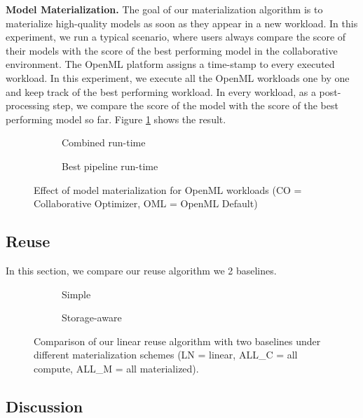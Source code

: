 \textbf{Model Materialization. }
The goal of our materialization algorithm is to materialize high-quality models as soon as they appear in a new workload.
In this experiment, we run a typical scenario, where users always compare the score of their models with the score of the best performing model in the collaborative environment.
The OpenML platform assigns a time-stamp to every executed workload.
In this experiment, we execute all the OpenML workloads one by one and keep track of the best performing workload.
In every workload, as a post-processing step, we compare the score of the model with the score of the best performing model so far.
Figure \ref{exp-model-materialization} shows the result.

\begin{figure}
\begin{subfigure}[b]{0.5\linewidth}
\centering
 \resizebox{\columnwidth}{!}{%
%
}
\caption{Combined run-time}
\end{subfigure}%
\begin{subfigure}[b]{0.5\linewidth}
\centering
 \resizebox{\columnwidth}{!}{%
%
}
\caption{Best pipeline run-time}
\end{subfigure}
\caption{Effect of model materialization for OpenML workloads (CO = Collaborative Optimizer, OML = OpenML Default)}
\label{exp-model-materialization}
\end{figure}

\subsection{Reuse}
In this section, we compare our reuse algorithm we 2 baselines.
\begin{figure}
\begin{subfigure}[b]{0.5\linewidth}
\centering
 \resizebox{\columnwidth}{!}{%
%
}
\caption{Simple}
\end{subfigure}%
\begin{subfigure}[b]{0.5\linewidth}
\centering
 \resizebox{\columnwidth}{!}{%
%
}

\caption{Storage-aware}
\end{subfigure}
\caption{Comparison of our linear reuse algorithm with two baselines under different materialization schemes (LN = linear, ALL\_C = all compute, ALL\_M = all materialized).}
\end{figure}

\subsection{Discussion}
